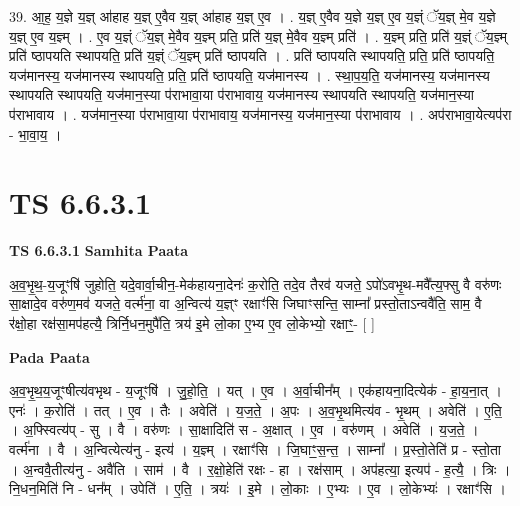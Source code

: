 \documentclass[17pt]{extarticle}
\begin{document}
39. आ॒ह॒ य॒ज्ञे य॒ज्ञ् आ॑हाह य॒ज्ञ् ए॒वैव य॒ज्ञ् आ॑हाह य॒ज्ञ् ए॒व । . य॒ज्ञ् ए॒वैव य॒ज्ञे य॒ज्ञ् ए॒व य॒ज्ञ्ं ॅय॒ज्ञ् मे॒व य॒ज्ञे य॒ज्ञ् ए॒व य॒ज्ञ्म् । . ए॒व य॒ज्ञ्ं ॅय॒ज्ञ् मे॒वैव य॒ज्ञ्म् प्रति॒ प्रति॑ य॒ज्ञ् मे॒वैव य॒ज्ञ्म् प्रति॑ । . य॒ज्ञ्म् प्रति॒ प्रति॑ य॒ज्ञ्ं ॅय॒ज्ञ्म् प्रति॑ ष्ठापयति स्थापयति॒ प्रति॑ य॒ज्ञ्ं ॅय॒ज्ञ्म् प्रति॑ ष्ठापयति । . प्रति॑ ष्ठापयति स्थापयति॒ प्रति॒ प्रति॑ ष्ठापयति॒ यज॑मानस्य॒ यज॑मानस्य स्थापयति॒ प्रति॒ प्रति॑ ष्ठापयति॒ यज॑मानस्य । . स्था॒प॒य॒ति॒ यज॑मानस्य॒ यज॑मानस्य स्थापयति स्थापयति॒ यज॑मान॒स्या प॑राभावा॒या प॑राभावाय॒ यज॑मानस्य स्थापयति स्थापयति॒ यज॑मान॒स्या प॑राभावाय । . यज॑मान॒स्या प॑राभावा॒या प॑राभावाय॒ यज॑मानस्य॒ यज॑मान॒स्या प॑राभावाय । . अप॑राभावा॒येत्यप॑रा - भा॒वा॒य॒ । \newline
\pagebreak
{}

\section{ TS 6.6.3.1 }

\textbf{TS 6.6.3.1 } \newline
\textbf{Samhita Paata} \newline

अ॒व॒भृ॒थ॒-य॒जूꣳषि॑ जुहोति॒ यदे॒वार्वा॒चीन॒-मेक॑हायना॒देनः॑ क॒रोति॒ तदे॒व तैरव॑ यजते॒ ऽपो॑ऽवभृ॒थ-मवै᳚त्य॒फ्सु वै वरु॑णः सा॒क्षादे॒व वरु॑ण॒मव॑ यजते॒ वर्त्म॑ना॒ वा अ॒न्वित्य॑ य॒ज्ञ्ꣳ रक्षाꣳ॑सि जिघाꣳसन्ति॒ साम्ना᳚ प्रस्तो॒ताऽन्ववै॑ति॒ साम॒ वै र॑क्षो॒हा रक्ष॑सा॒मप॑हत्यै॒ त्रिर्नि॒धन॒मुपै॑ति॒ त्रय॑ इ॒मे लो॒का ए॒भ्य ए॒व लो॒केभ्यो॒ रक्षाꣳ॒॒- [  ] \newline

\textbf{Pada Paata} \newline

अ॒व॒भृ॒थ॒य॒जूꣳषीत्य॑वभृथ - य॒जूꣳषि॑ । जु॒हो॒ति॒ । यत् । ए॒व । अ॒र्वा॒चीन᳚म् । एक॑हायना॒दित्येक॑ - हा॒य॒ना॒त् । एनः॑ । क॒रोति॑ । तत् । ए॒व । तैः । अवेति॑ । य॒ज॒ते॒ । अ॒पः । अ॒व॒भृ॒थमित्य॑व - भृ॒थम् । अवेति॑ । ए॒ति॒ । अ॒फ्स्वित्य॑प् - सु । वै । वरु॑णः । सा॒क्षादिति॑ स - अ॒क्षात् । ए॒व । वरु॑णम् । अवेति॑ । य॒ज॒ते॒ । वर्त्म॑ना । वै । अ॒न्वित्येत्य॑नु - इत्य॑ । य॒ज्ञ्म् । रक्षाꣳ॑सि । जि॒घाꣳ॒॒स॒न्त॒ । साम्ना᳚ । प्र॒स्तो॒तेति॑ प्र - स्तो॒ता । अ॒न्ववै॒तीत्य॑नु - अवै॑ति । साम॑ । वै । र॒क्षो॒हेति॑ रक्षः - हा । रक्ष॑साम् । अप॑हत्या॒ इत्यप॑ - ह॒त्यै॒ । त्रिः । नि॒धन॒मिति॑ नि - धन᳚म् । उपेति॑ । ए॒ति॒ । त्रयः॑ । इ॒मे । लो॒काः । ए॒भ्यः । ए॒व । लो॒केभ्यः॑ । रक्षाꣳ॑सि ।  \newline
\end{document}
